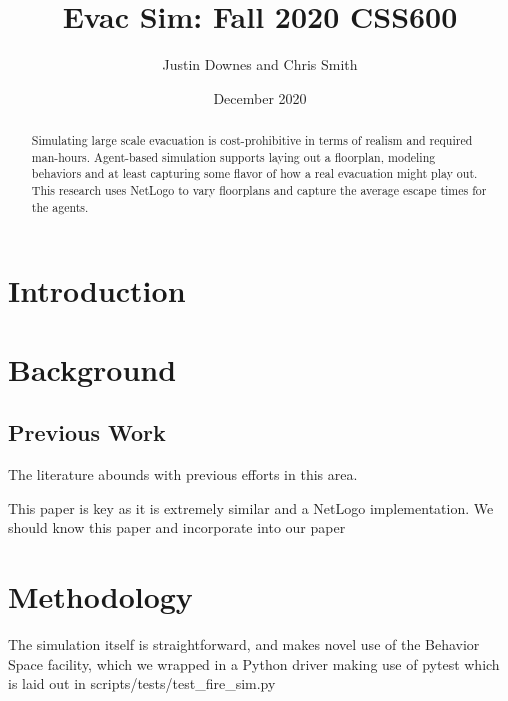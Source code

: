 \documentclass[12pt,letterpaper]{article}
\begin{document}
\title{Evac Sim: Fall 2020 CSS600 }

\author{Justin Downes and Chris Smith}
\date{December 2020}
\maketitle

\begin{abstract}
Simulating large scale evacuation is cost-prohibitive in terms of realism and
required man-hours. Agent-based simulation supports laying out a floorplan,
modeling behaviors and at least capturing some flavor of how a real evacuation
might play out. This research uses NetLogo to vary floorplans and capture the
average escape times for the agents.
\end{abstract}
\section {Introduction}
\section {Background}
\subsection{Previous Work}
The literature abounds with previous efforts in this area.
\cite{almeidaCrowdSimulationModeling2013} 
\cite{kneidl}
\cite{kuligowskil}
\cite{abmEvac}
\cite{zhouSimulationPedestrianEvacuation2019}

This paper is key as it is extremely similar and a NetLogo implementation.  We should know this paper and incorporate into our paper \cite{prioritEvac}

\section {Methodology}
The simulation itself is straightforward, and makes novel use of the Behavior
Space facility, which we wrapped in a Python driver making use of pytest which
is laid out in scripts/tests/test_fire_sim.py
\end{document}
